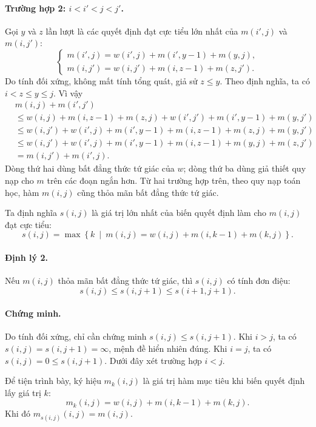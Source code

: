 \documentclass[11pt]{article}
\begin{document}
\paragraph{Trường hợp 2: $i<i'<j<j'$.}
Gọi $y$ và $z$ lần lượt là các quyết định đạt cực tiểu lớn nhất của
$m(i',j)$ và $m(i,j')$:
\[
\begin{cases}
  m(i',j)=w(i',j)+m(i',y-1)+m(y,j),\\
  m(i,j')=w(i,j')+m(i,z-1)+m(z,j').
\end{cases}
\]
Do tính đối xứng, không mất tính tổng quát, giả sử $z\le y$. Theo định nghĩa,
ta có $i<z\le y\le j$. Vì vậy
\[
\begin{aligned}
  &m(i,j)+m(i',j')\\
  &\le w(i,j)+m(i,z-1)+m(z,j)
       +w(i',j')+m(i',y-1)+m(y,j') \\
  &\le w(i,j')+w(i',j)
       +m(i',y-1)+m(i,z-1)+m(z,j)+m(y,j') \\
  &\le w(i,j')+w(i',j)
       +m(i',y-1)+m(i,z-1)+m(y,j)+m(z,j') \\
  &=m(i,j')+m(i',j).
\end{aligned}
\]
Dòng thứ hai dùng bất đẳng thức tứ giác của $w$; dòng thứ ba dùng giả thiết
quy nạp cho $m$ trên các đoạn ngắn hơn. Từ hai trường hợp trên, theo quy nạp
toán học, hàm $m(i,j)$ cũng thỏa mãn bất đẳng thức tứ giác.

Ta định nghĩa $s(i,j)$ là giá trị lớn nhất của biến quyết định làm cho
$m(i,j)$ đạt cực tiểu:
\[
  s(i,j)=
  \max\left\{
    k\ \middle|\ 
    m(i,j)=w(i,j)+m(i,k-1)+m(k,j)
  \right\}.
  \tag{1.3}
\]

\paragraph{Định lý 2.}
Nếu $m(i,j)$ thỏa mãn bất đẳng thức tứ giác, thì $s(i,j)$ có tính đơn điệu:
\[
  s(i,j)\le s(i,j+1)\le s(i+1,j+1).
\]

\paragraph{Chứng minh.}
Do tính đối xứng, chỉ cần chứng minh
$s(i,j)\le s(i,j+1)$. Khi $i>j$, ta có
$s(i,j)=s(i,j+1)=\infty$, mệnh đề hiển nhiên đúng. Khi $i=j$, ta có
$s(i,j)=0\le s(i,j+1)$. Dưới đây xét trường hợp $i<j$.

Để tiện trình bày, ký hiệu $m_k(i,j)$ là giá trị hàm mục tiêu khi biến quyết
định lấy giá trị $k$:
\[
  m_k(i,j)=w(i,j)+m(i,k-1)+m(k,j).
\]
Khi đó $m_{s(i,j)}(i,j)=m(i,j)$.
\end{document}
